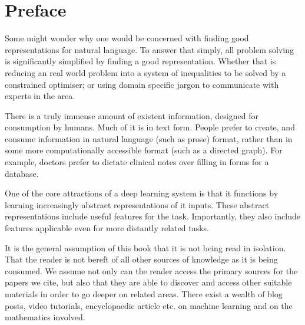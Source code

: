 \documentclass[12pt,parskip]{komatufte}
\begin{document}

\chapter{Preface}\label{sec:introduction}

Some might wonder why one would be concerned with finding good representations for natural language.
To answer that simply, all problem solving is significantly simplified by finding a good representation.
Whether that is reducing an real world problem into a system of inequalities to be solved by a constrained optimiser; or using domain specific jargon to communicate with experts in the area.


There is a truly immense amount of existent information, designed for consumption by humans.
Much of it is in text form.
People prefer to create, and consume information in natural language (such as prose) format,
rather than in some more computationally accessible format (such as a directed graph).
For example, doctors prefer to dictate clinical notes over filling in forms for a database.



One of the core attractions of a deep learning system is that it functions by learning increasingly abstract representations of it inputs.
These abstract representations include useful features for the task.
Importantly, they also include features applicable even for more distantly related tasks.



It is the general assumption of this book that it is not being read in isolation.
That the reader is not bereft of all other sources of knowledge as it is being consumed.
We assume not only can the reader access the primary sources for the papers we cite,
but also that they are able to discover and access other suitable materials 
in order to go deeper on related areas.
There exist a wealth of blog posts, video tutorials, encyclopaedic article etc. on machine learning and on the mathematics involved.
\end{document}

